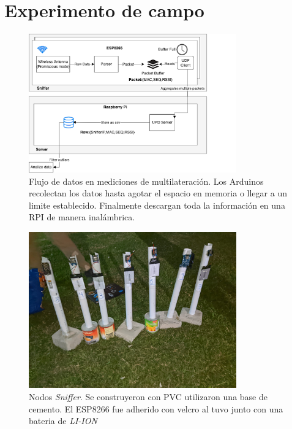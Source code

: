 \section{Experimento de campo}
\begin{figure}[!htb]
	\centering
	\includegraphics[width=0.8\textwidth]{Figuras/infraestructure/arduino-rpi-multi.png}
	\captionsetup{margin=2cm}
	\caption[Flujo de datos en mediciones de multilateración]{Flujo de datos en mediciones de multilateración. Los Arduinos recolectan los datos hasta agotar el espacio en memoria o llegar a un limite establecido. Finalmente descargan toda la información en una RPI de manera inalámbrica. }
	\label{fig:infra-diagram-arduino}
\end{figure}
\begin{figure}[!htb]
	\centering
	\includegraphics[width=0.8\textwidth]{Figuras/fieldwork/esp-poles-2.png}
	\captionsetup{margin=2cm}
	\caption[Postes Nodo Multilateración]{ Nodos \textit{Sniffer}. Se construyeron con PVC utilizaron una base de cemento. El ESP8266 fue adherido con velcro al tuvo junto con una bateria de \textit{LI-ION} }
	\label{fig:infra-diagram-arduino}
\end{figure}

